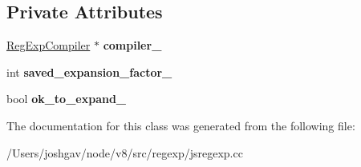 \subsection*{Private Attributes}
\begin{DoxyCompactItemize}
\item 
\hyperlink{classv8_1_1internal_1_1_reg_exp_compiler}{Reg\+Exp\+Compiler} $\ast$ {\bfseries compiler\+\_\+}\hypertarget{classv8_1_1internal_1_1_reg_exp_expansion_limiter_aa026a5d70ef2c3612d321c116ffe7ae1}{}\label{classv8_1_1internal_1_1_reg_exp_expansion_limiter_aa026a5d70ef2c3612d321c116ffe7ae1}

\item 
int {\bfseries saved\+\_\+expansion\+\_\+factor\+\_\+}\hypertarget{classv8_1_1internal_1_1_reg_exp_expansion_limiter_a6a03f4363cdbe36dd8161a99c9b7d378}{}\label{classv8_1_1internal_1_1_reg_exp_expansion_limiter_a6a03f4363cdbe36dd8161a99c9b7d378}

\item 
bool {\bfseries ok\+\_\+to\+\_\+expand\+\_\+}\hypertarget{classv8_1_1internal_1_1_reg_exp_expansion_limiter_aa75a2eeb5e8494f157068795a717c4d7}{}\label{classv8_1_1internal_1_1_reg_exp_expansion_limiter_aa75a2eeb5e8494f157068795a717c4d7}

\end{DoxyCompactItemize}


The documentation for this class was generated from the following file\+:\begin{DoxyCompactItemize}
\item 
/\+Users/joshgav/node/v8/src/regexp/jsregexp.\+cc\end{DoxyCompactItemize}
